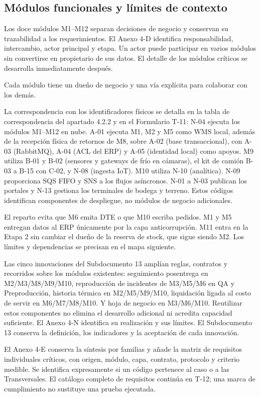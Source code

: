 \subsection{Módulos funcionales y límites de contexto}
\label{sec:modulos-funcionales}

Los doce módulos M1--M12 separan decisiones de negocio y conservan su trazabilidad a los requerimientos. El Anexo 4-D identifica responsabilidad, intercambio, actor principal y etapa. Un actor puede participar en varios módulos sin convertirse en propietario de sus datos. El detalle de los módulos críticos se desarrolla inmediatamente después.


Cada módulo tiene un dueño de negocio y una vía explícita para colaborar con los demás.

La correspondencia con los identificadores físicos se detalla en la tabla de correspondencia del apartado 4.2.2 y en el Formulario T-11: N-04 ejecuta los módulos M1--M12 en nube. A-01 ejecuta M1, M2 y M5 como WMS local, además de la recepción física de retornos de M8, sobre A-02 (base transaccional), con A-03 (RabbitMQ), A-04 (ACL del ERP) y A-05 (identidad local) como apoyos. M9 utiliza B-01 y B-02 (sensores y gateways de frío en cámaras), el kit de camión B-03 a B-15 con C-02, y N-08 (ingesta IoT). M10 utiliza N-10 (analítica). N-09 proporciona SQS FIFO y SNS a los flujos asíncronos. N-01 a N-03 publican los portales y N-13 gestiona los terminales de bodega y terreno. Estos códigos identifican componentes de despliegue, no módulos de negocio adicionales.

El reparto evita que M6 emita DTE o que M10 escriba pedidos. M1 y M5 entregan datos al ERP únicamente por la capa anticorrupción. M11 entra en la Etapa 2 sin cambiar el dueño de la reserva de stock, que sigue siendo M2. Los límites y dependencias se precisan en el mapa siguiente.

Las cinco innovaciones del Subdocumento 13 amplían reglas, contratos y recorridos sobre los módulos existentes: seguimiento posentrega en M2/M3/M8/M9/M10, reproducción de incidentes de M3/M5/M6 en QA y Preproducción, historia térmica en M2/M5/M9/M10, liquidación ligada al costo de servir en M6/M7/M8/M10. Y hoja de negocio en M3/M6/M10. Reutilizar estos componentes no elimina el desarrollo adicional ni acredita capacidad suficiente. El Anexo 4-N identifica su realización y sus límites. El Subdocumento 13 conserva la definición, los indicadores y la aceptación de cada innovación.

El Anexo 4-E conserva la síntesis por familias y añade la matriz de requisitos individuales críticos, con origen, módulo, capa, contrato, protocolo y criterio medible. Se identifica expresamente si un código pertenece al caso o a las Transversales. El catálogo completo de requisitos continúa en T-12; una marca de cumplimiento no sustituye una prueba ejecutada.


